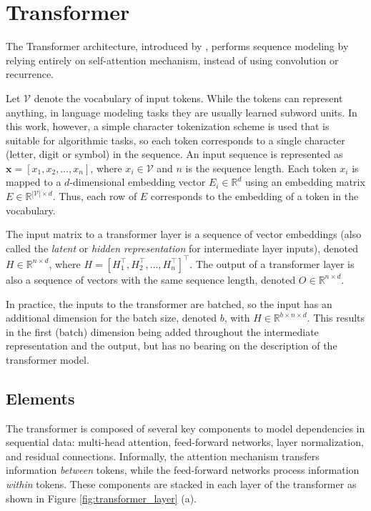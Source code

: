 \section{Transformer}\label{sec:transformer_arch}

The Transformer architecture, introduced by \textcite{vaswani_attention_2017}, performs sequence modeling by relying entirely on self-attention mechanism, instead of using convolution or recurrence.

Let $\mathcal{V}$ denote the vocabulary of input tokens. While the tokens can represent anything, in language modeling tasks they are usually learned subword units. In this work, however, a simple character tokenization scheme is used that is suitable for algorithmic tasks, so each token corresponds to a single character (letter, digit or symbol) in the sequence. An input sequence is represented as $\mathbf{x} = [x_1, x_2, \dots, x_n]$, where $x_i \in \mathcal{V}$ and $n$ is the sequence length. Each token $x_i$ is mapped to a $d$-dimensional embedding vector $E_i \in \mathbb{R}^d$ using an embedding matrix $E \in \mathbb{R}^{|\mathcal{V}| \times d}$. Thus, each row of $E$ corresponds to the embedding of a token in the vocabulary.

The input matrix to a transformer layer is a sequence of vector embeddings (also called the \emph{latent} or \emph{hidden representation} for intermediate layer inputs), denoted $H \in \mathbb{R}^{n \times d}$, where $H = [H_1^\top, H_2^\top, \dots, H_n^\top]^\top$. The output of a transformer layer is also a sequence of vectors with the same sequence length, denoted $O \in \mathbb{R}^{n \times d}$.

In practice, the inputs to the transformer are batched, so the input has an additional dimension for the batch size, denoted $b$, with $H \in \mathbb{R}^{b \times n \times d}$. This results in the first (batch) dimension being added throughout the intermediate representation and the output, but has no bearing on the description of the transformer model.

\subsection{Elements}\label{subsec:elements_transformers}

The transformer is composed of several key components to model dependencies in sequential data: multi-head attention, feed-forward networks, layer normalization, and residual connections. Informally, the attention mechanism transfers information \emph{between} tokens, while the feed-forward networks process information \emph{within} tokens. These components are stacked in each layer of the transformer as shown in Figure \ref{fig:transformer_layer} (a).

